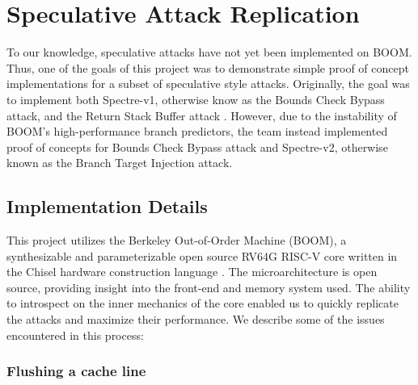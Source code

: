 \section{Speculative Attack Replication}

To our knowledge, speculative attacks have not yet been implemented on BOOM. Thus,
one of the goals of this project was to demonstrate simple proof of concept implementations for a
subset of speculative style attacks. Originally, the goal was to implement both 
Spectre-v1, otherwise know as the Bounds Check Bypass attack, and the Return Stack Buffer attack \cite{b3}.
However, due to the instability of BOOM's high-performance branch predictors, the team instead implemented
proof of concepts for Bounds Check Bypass attack and Spectre-v2, otherwise known as the
Branch Target Injection attack.

\subsection{Implementation Details}

This project utilizes the Berkeley Out-of-Order Machine (BOOM), a synthesizable and 
parameterizable open source RV64G RISC-V core written in the Chisel hardware construction language \cite{b49}. 
The microarchitecture is open source, providing insight into the front-end and memory system
used. The ability to introspect on the inner mechanics of the core enabled us to quickly replicate the attacks and maximize their performance. We describe some of the issues encountered in this process:

\subsubsection{Flushing a cache line}



